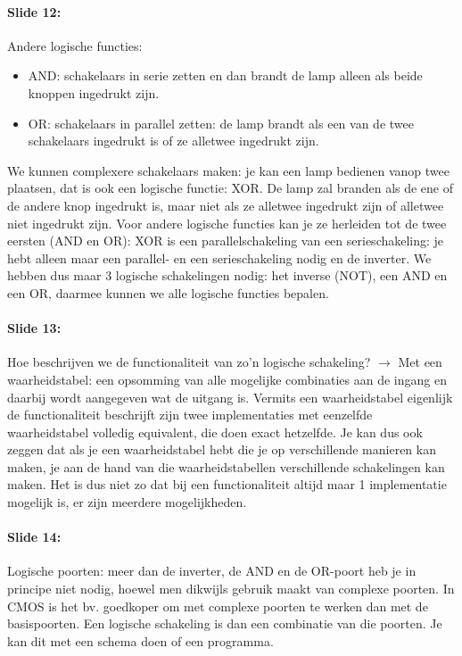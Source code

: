 \documentclass[10pt,a4paper]{book}
\begin{document}
\paragraph{Slide 12:} Andere logische functies: 
\begin{itemize}
\item AND: schakelaars in serie zetten en dan brandt de lamp alleen als beide knoppen ingedrukt zijn.
\item OR: schakelaars in parallel zetten: de lamp brandt als een van de twee schakelaars ingedrukt is of ze alletwee ingedrukt zijn.
\end{itemize}
We kunnen complexere schakelaars maken: je kan een lamp bedienen vanop twee plaatsen, dat is ook een logische functie: XOR. De lamp zal branden als de ene of de andere knop ingedrukt is, maar niet als ze alletwee ingedrukt zijn of alletwee niet ingedrukt zijn. Voor andere logische functies kan je ze herleiden tot de twee eersten (AND en OR): XOR is een parallelschakeling van een serieschakeling: je hebt alleen maar een parallel- en een serieschakeling nodig en de inverter. We hebben dus maar 3 logische schakelingen nodig: het inverse (NOT), een AND en een OR, daarmee kunnen we alle logische functies bepalen.

\paragraph{Slide 13:} Hoe beschrijven we de functionaliteit van zo'n logische schakeling? $\rightarrow$ Met een waarheidstabel: een opsomming van alle mogelijke combinaties aan de ingang en daarbij wordt aangegeven wat de uitgang is. Vermits een waarheidstabel eigenlijk de functionaliteit beschrijft zijn twee implementaties met eenzelfde waarheidstabel volledig equivalent, die doen exact hetzelfde. Je kan dus ook zeggen dat als je een waarheidstabel hebt die je op verschillende manieren kan maken, je aan de hand van die waarheidstabellen verschillende schakelingen kan maken. Het is dus niet zo dat bij een functionaliteit altijd maar 1 implementatie mogelijk is, er zijn meerdere mogelijkheden.

\paragraph{Slide 14:} Logische poorten: meer dan de inverter, de AND en de OR-poort heb je in principe niet nodig, hoewel men dikwijls gebruik maakt van complexe poorten. In CMOS is het bv. goedkoper om met complexe poorten te werken dan met de basispoorten. Een logische schakeling is dan een combinatie van die poorten. Je kan dit met een schema doen of een programma.
\end{document}
